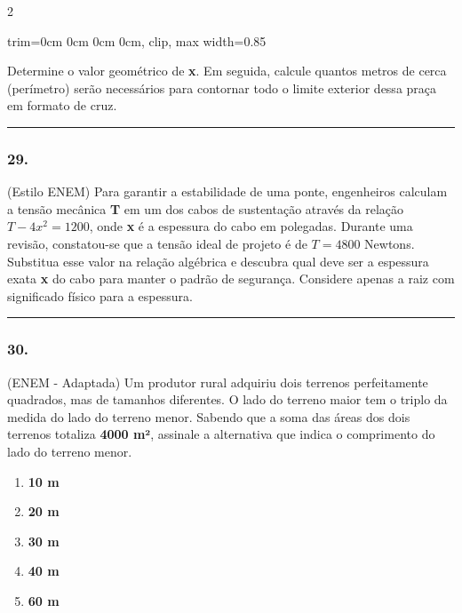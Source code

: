 \documentclass[twoside, 10pt, a4paper]{article}
\newlength{\espacoPreQuestao}\setlength{\espacoPreQuestao}{0.1cm}
\newlength{\espacoQuestao}\setlength{\espacoQuestao}{0.2cm}
\newcommand{\larguraTikz}{0.85\linewidth}
\begin{document}
\begin{multicols*}{2}
\begin{center}
\begin{adjustbox}{trim=0cm 0cm 0cm 0cm, clip, max width=\larguraTikz}
\end{adjustbox}
\end{center}

Determine o valor geométrico de \textbf{x}. Em seguida, calcule quantos metros de cerca (perímetro) serão necessários para contornar todo o limite exterior dessa praça em formato de cruz.
\par\vspace{\espacoQuestao}

\noindent\textcolor{CorLinha}{\rule{\linewidth}{0.5pt}} 
\par\vspace{\espacoPreQuestao}
\subsubsection*{29.} (Estilo ENEM) Para garantir a estabilidade de uma ponte, engenheiros calculam a tensão mecânica \textbf{T} em um dos cabos de sustentação através da relação $ T - 4x^2 = 1200 $, onde \textbf{x} é a espessura do cabo em polegadas. Durante uma revisão, constatou-se que a tensão ideal de projeto é de $ T = 4800 $ Newtons. Substitua esse valor na relação algébrica e descubra qual deve ser a espessura exata \textbf{x} do cabo para manter o padrão de segurança. Considere apenas a raiz com significado físico para a espessura.
\par\vspace{\espacoQuestao}

\noindent\textcolor{CorLinha}{\rule{\linewidth}{0.5pt}} 
\par\vspace{\espacoPreQuestao}
\subsubsection*{30.} (ENEM - Adaptada) Um produtor rural adquiriu dois terrenos perfeitamente quadrados, mas de tamanhos diferentes. O lado do terreno maior tem o triplo da medida do lado do terreno menor. Sabendo que a soma das áreas dos dois terrenos totaliza \textbf{4000 m²}, assinale a alternativa que indica o comprimento do lado do terreno menor.
\begin{enumerate}[label=\alph*)]
    \item \textbf{10 m}
    \item \textbf{20 m}
    \item \textbf{30 m}
    \item \textbf{40 m}
    \item \textbf{60 m}
\end{enumerate}
\par\vspace{\espacoQuestao}

\end{multicols*}
\end{document}
